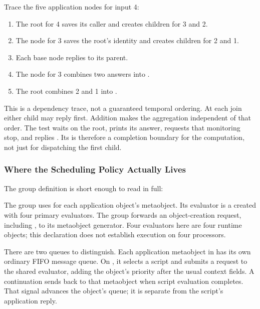 Trace the five application nodes for input 4:

\begin{enumerate}
  \item The root for 4 saves its caller and creates children for 3 and 2.
  \item The node for 3 saves the root's identity and creates children
        for 2 and 1.
  \item Each base node replies \code{[:ans 1]} to its parent.
  \item The node for 3 combines two answers into \code{[:ans 2]}.
  \item The root combines 2 and 1 into \code{[:ans 3]}.
\end{enumerate}

This is a dependency trace, not a guaranteed temporal ordering.
At each join either child may reply first. Addition makes the
aggregation independent of that order. The test waits on the root,
prints its answer, requests that monitoring stop, and replies .
Its \code{<==} is therefore a completion boundary for the computation,
not just for dispatching the first child.

\subsubsection{Where the Scheduling Policy Actually Lives}
\label{sec:pcontrol-policy}

The group definition is short enough to read in full:


The group uses  for each application object's
metaobject. Its evaluator is a  created with four
primary evaluators. The group forwards an object-creation request,
including , to its metaobject generator.
Four evaluators here are four runtime objects; this declaration does
not establish execution on four processors.

There are two queues to distinguish. Each application metaobject in
 has its own ordinary FIFO message queue.
On , it selects a script and submits a \code{[:do ...]}
request to the shared evaluator, adding the object's priority after
the usual context fields. A continuation sends  back to
that metaobject when script evaluation completes. That signal advances
the object's queue; it is separate from the script's application reply.

